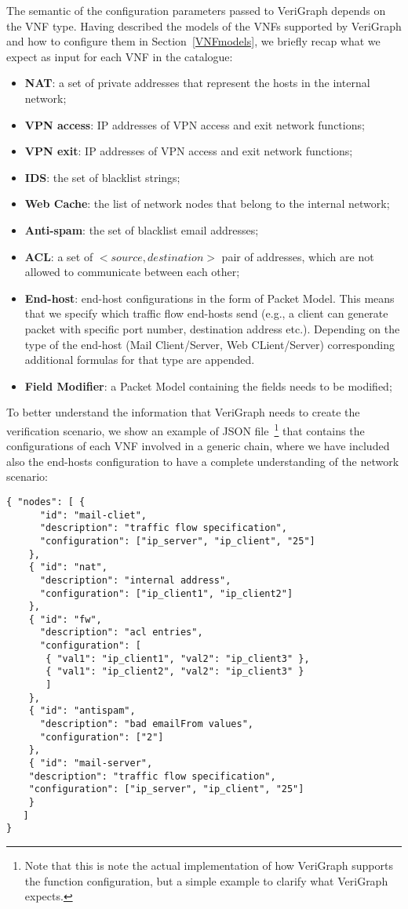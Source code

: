 The semantic of the configuration parameters passed to VeriGraph depends on the VNF type. Having described the models of the VNFs supported by VeriGraph and how to configure them in Section~\ref{VNFmodels}, we briefly recap what we expect as input for each VNF in the catalogue:
\begin{itemize}
	\item \textbf{NAT}: a set of private addresses that represent the hosts in the internal network; 
	\item \textbf{VPN access}: IP addresses of VPN access and exit network functions;
	\item \textbf{VPN exit}:  IP addresses of VPN access and exit network functions;
	\item \textbf{IDS}: the set of blacklist strings;
	\item \textbf{Web Cache}: the list of network nodes that belong to the internal network;
	\item \textbf{Anti-spam}: the set of blacklist email addresses;
	\item \textbf{ACL}: a set of \textit{$<source, destination>$} pair of addresses, which are not allowed to communicate between each other;
	\item \textbf{End-host}: end-host configurations in the form of Packet Model. This means that we specify which traffic flow end-hosts send (e.g., a client can generate packet with specific port number, destination address etc.). Depending on the type of the end-host (Mail Client/Server, Web CLient/Server) corresponding additional formulas for that type are appended.
	\item \textbf{Field Modifier}: a Packet Model containing the fields needs to be modified;
\end{itemize}


To better understand the information that VeriGraph needs to create the verification scenario, we show an example of JSON file~\footnote{Note that this is note the actual implementation of how VeriGraph supports the function configuration, but a simple example to clarify what VeriGraph expects.} that contains the configurations of each VNF involved in a generic chain, where we have included also the end-hosts configuration to have a complete understanding of the network scenario:\\

\begin{lstlisting}[firstnumber=1]
{ "nodes": [ {
      "id": "mail-cliet",
      "description": "traffic flow specification",
      "configuration": ["ip_server", "ip_client", "25"]
	},
    { "id": "nat",
      "description": "internal address",
      "configuration": ["ip_client1", "ip_client2"]
    },
    { "id": "fw",
      "description": "acl entries",
      "configuration": [
       { "val1": "ip_client1", "val2": "ip_client3" },
       { "val1": "ip_client2", "val2": "ip_client3" }
       ]
    },
    { "id": "antispam",
      "description": "bad emailFrom values",
      "configuration": ["2"]
    },
    { "id": "mail-server",
    "description": "traffic flow specification",
    "configuration": ["ip_server", "ip_client", "25"]
    }
   ]
}
\end{lstlisting}